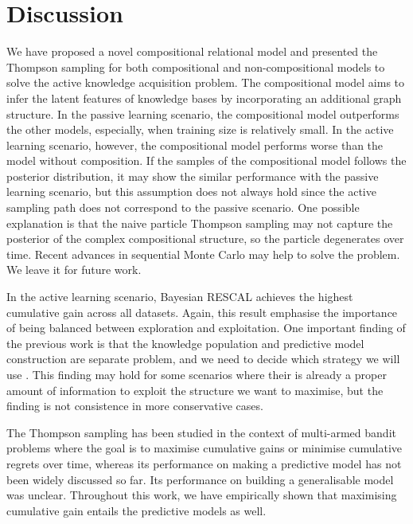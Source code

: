 \section{Discussion}
We have proposed a novel compositional relational model and presented the
Thompson sampling for both compositional and non-compositional models to solve the active knowledge acquisition 
problem. The compositional model aims to infer the latent features of knowledge 
bases by incorporating an additional graph structure. In the passive 
learning scenario, the compositional model outperforms the other models, 
especially, when training size is relatively small. In the active learning 
scenario, however, the compositional model performs worse than the model without 
composition. If the samples of the compositional model follows the posterior 
distribution, it may show the similar performance with the passive learning 
scenario, but this assumption does not always hold since the active sampling
path does not correspond to the passive scenario. One possible explanation is 
that the naive particle Thompson sampling may not capture the posterior of the 
complex compositional structure, so the particle degenerates over time. Recent
 advances in sequential Monte Carlo may help to solve the problem\cite{gu2015neural,naesseth2014sequential,lindsten2014divide}. 
We leave it  for future work.
 
In the active learning scenario, Bayesian RESCAL achieves the highest 
cumulative gain across all datasets. Again, this result emphasise the 
importance of being balanced between exploration and exploitation. One 
important finding of the previous work is that the knowledge population 
and predictive model construction are separate problem, and we need to 
decide which strategy we will use \cite{kajino2015active}. This finding
may hold for some scenarios where their is already a proper amount of 
information to exploit the structure we want to maximise, but the finding 
is not consistence in more conservative cases.

The Thompson sampling has been studied in the context of multi-armed bandit 
problems where the goal is to maximise cumulative gains or minimise cumulative 
regrets over time, whereas its performance on making a predictive model has not 
been widely discussed so far. Its performance on building a generalisable model 
was unclear. Throughout this work, we have empirically shown that maximising 
cumulative gain entails the predictive models as well.

